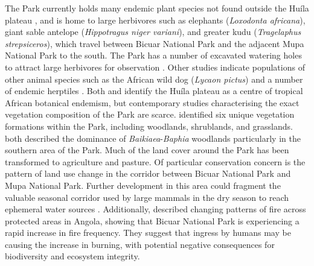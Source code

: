 \begin{refsection}
The Park currently holds many endemic plant species not found outside the Hu\'{i}la plateau \citep{Huntley2019}, and is home to large herbivores such as elephants (\textit{Loxodonta africana}), giant sable antelope (\textit{Hippotragus niger variani}), and greater kudu (\textit{Tragelaphus strepsiceros}), which travel between Bicuar National Park and the adjacent Mupa National Park to the south. The Park has a number of excavated watering holes to attract large herbivores for observation \citep{Simoes1971}. Other studies indicate populations of other animal species such as the African wild dog (\textit{Lycaon pictus}) \citep{Beja2019, Overton2016} and a number of endemic herptiles \citep{Baptista2019}. Both \citet{Linder2001} and \citet{Droissart2018} identify the Hu\'{i}la plateau as a centre of tropical African botanical endemism, but contemporary studies characterising the exact vegetation composition of the Park are scarce. \citet{Teixeira1968} identified six unique vegetation formations within the Park, including woodlands, shrublands, and grasslands. \citet{Barbosa1970, Chisingui2018} both described the dominance of \textit{Baikiaea}-\textit{Baphia} woodlands particularly in the southern area of the Park. Much of the land cover around the Park has been transformed to agriculture and pasture. Of particular conservation concern is the pattern of land use change in the corridor between Bicuar National Park and Mupa National Park. Further development in this area could fragment the valuable seasonal corridor used by large mammals in the dry season to reach ephemeral water sources \citep{Overton2016}. Additionally, \citet{Catarino2020} described changing patterns of fire across protected areas in Angola, showing that Bicuar National Park is experiencing a rapid increase in fire frequency. They suggest that ingress by humans may be causing the increase in burning, with potential negative consequences for biodiversity and ecosystem integrity. 


\end{refsection}
